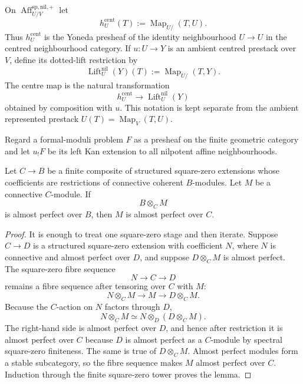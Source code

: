 \begin{definition}
\label{def:bnli-centred-yoneda}
On $\operatorname{Aff}^{\mathrm{sp,nil,+}}_{U/V}$ let
\[
\boxed{
    h_U^{\mathrm{cent}}(T)
    :=
    \operatorname{Map}_{U/}(T,U).}
\]
Thus $h_U^{\mathrm{cent}}$ is the Yoneda presheaf of the identity
neighbourhood $U\to U$ in the centred neighbourhood category.  If
$u:U\to Y$ is an ambient centred prestack over $V$, define its dotted-lift
restriction by
\[
\boxed{
    \operatorname{Lift}^{\mathrm{nil}}_U(Y)(T)
    :=
    \operatorname{Map}_{U/}(T,Y).}
\]
The centre map is the natural transformation
\[
    h_U^{\mathrm{cent}}
    \longrightarrow
    \operatorname{Lift}^{\mathrm{nil}}_U(Y)
\]
obtained by composition with $u$.  This notation is kept separate from the
ambient represented prestack $U(T)=\operatorname{Map}_V(T,U)$.
\end{definition}


Regard a formal-moduli problem $F$ as a presheaf on the finite geometric
category and let $u_!F$ be its left Kan extension to all nilpotent affine
neighbourhoods.

\begin{lemma}
\label{lem:bnli-nilpotent-descent-aperf}
Let $C\to B$ be a finite composite of structured square-zero extensions whose
coefficients are restrictions of connective coherent $B$-modules.  Let $M$ be
a connective $C$-module.  If
\[
    B\otimes_C M
\]
is almost perfect over $B$, then $M$ is almost perfect over $C$.
\end{lemma}

\begin{proof}
It is enough to treat one square-zero stage and then iterate.  Suppose
$C\to D$ is a structured square-zero extension with coefficient $N$, where
$N$ is connective and almost perfect over $D$, and suppose
$D\otimes_C M$ is almost perfect.  The square-zero fibre sequence
\[
    N\longrightarrow C\longrightarrow D
\]
remains a fibre sequence after tensoring over $C$ with $M$:
\[
    N\otimes_C M
    \longrightarrow M
    \longrightarrow D\otimes_C M.
\]
Because the $C$-action on $N$ factors through $D$,
\[
    N\otimes_C M
    \simeq
    N\otimes_D(D\otimes_C M).
\]
The right-hand side is almost perfect over $D$, and hence after restriction it
is almost perfect over $C$ because $D$ is almost perfect as a $C$-module by
spectral square-zero finiteness.  The same is true of $D\otimes_CM$.  Almost
perfect modules form a stable subcategory, so the fibre sequence makes $M$
almost perfect over $C$.  Induction through the finite square-zero tower proves
the lemma.
\end{proof}

